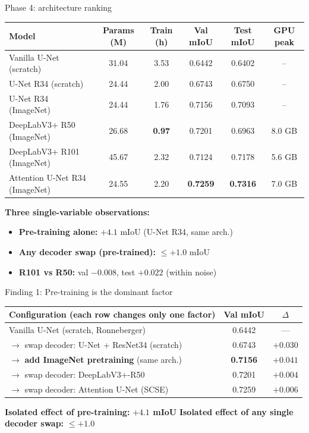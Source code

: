 \documentclass[aspectratio=169,12pt,xcolor={table}]{beamer}
\begin{document}
\begin{frame}{Phase 4: architecture ranking}
  \footnotesize
  \begin{tabular}{l c c c c c}
  \toprule
  Model & Params (M) & Train (h) & Val mIoU & Test mIoU & GPU peak \\
  \midrule
  Vanilla U-Net (scratch)         & 31.04 & 3.53 & 0.6442 & 0.6402 & -- \\
  U-Net R34 (scratch)             & 24.44 & 2.00 & 0.6743 & 0.6750 & -- \\
  U-Net R34 (ImageNet)            & 24.44 & 1.76 & 0.7156 & 0.7093 & -- \\
  DeepLabV3+ R50 (ImageNet)       & 26.68 & \textbf{0.97} & 0.7201 & 0.6963 & 8.0 GB \\
  DeepLabV3+ R101 (ImageNet)      & 45.67 & 2.32 & 0.7124 & 0.7178 & 5.6 GB \\
  \rowcolor{accent!15}
  Attention U-Net R34 (ImageNet)  & 24.55 & 2.20 & \textbf{0.7259} & \textbf{0.7316} & 7.0 GB \\
  \bottomrule
  \end{tabular}

  \vspace{0.6em}
  \small
  \textbf{Three single-variable observations:}
  \begin{itemize}
    \setlength{\itemsep}{0.1em}
    \item \textbf{Pre-training alone:} $+4.1$ mIoU (U-Net R34, same arch.)
    \item \textbf{Any decoder swap (pre-trained):} $\le +1.0$ mIoU
    \item \textbf{R101 vs R50:} val $-0.008$, test $+0.022$ (within noise)
  \end{itemize}
\end{frame}

\begin{frame}{Finding 1: Pre-training is the dominant factor}
  \centering
  \footnotesize
  \begin{tabular}{l c c}
  \toprule
  Configuration (each row changes only one factor) & Val mIoU & $\Delta$ \\
  \midrule
    Vanilla U-Net (scratch, Ronneberger)                    & 0.6442 & --- \\
    $\rightarrow$ swap decoder: U-Net + ResNet34 (scratch)  & 0.6743 & $+0.030$ \\
    $\rightarrow$ \textbf{add ImageNet pretraining} (same arch.)    & \textbf{0.7156} & \textbf{$+0.041$} \\
    $\rightarrow$ swap decoder: DeepLabV3+-R50              & 0.7201 & $+0.004$ \\
    $\rightarrow$ swap decoder: Attention U-Net (SCSE)      & 0.7259 & $+0.006$ \\
  \bottomrule
  \end{tabular}

  \vspace{0.8em}
  \small
  \textbf{Isolated effect of pre-training:} \textbf{$+4.1$ mIoU} \quad
  \textbf{Isolated effect of any single decoder swap:} $\le +1.0$
\end{frame}
\end{document}

